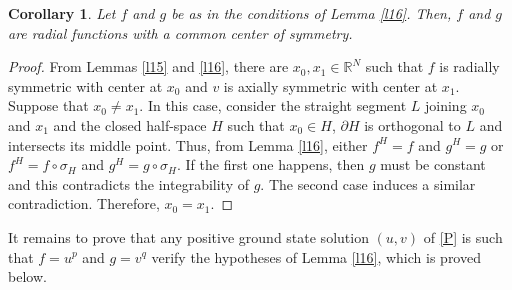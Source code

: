 \documentclass[12pt,a4paper]{article}
\newtheorem{corollary}[theorem]{Corollary}
\numberwithin{equation}{section}
\begin{document}
\begin{corollary}\label{c5}
Let $f$ and $g$ be as in the conditions of Lemma \ref{l16}. Then, $f$ and $g$ are radial functions with a common center of symmetry.
\end{corollary}
\begin{proof}
From Lemmas \ref{l15} and \ref{l16}, there are $x_0, x_1\in \mathbb{R}^N$ such that $f$ is radially symmetric with center at $x_0$ and $v$ is axially symmetric with center at $x_1$. Suppose that $x_0 \neq x_1$. In this case, consider the straight segment $L$ joining $x_0$ and $x_1$ and the closed half-space $H$ such that $x_0 \in H$, $\partial H$ is orthogonal to $L$ and intersects its middle point.  Thus, from Lemma \ref{l16}, either $f^H = f$ and $g^H = g$ or $f^H = f\circ \sigma_H $ and $g^H = g\circ \sigma_H$. If the first one happens, then $g$ must be constant and this contradicts the integrability of $g$. The second case induces a similar contradiction. Therefore, $x_0 = x_1$.
\end{proof}

It remains to prove that any positive ground state solution $(u,v)$ of \eqref{P} is such that $f= u^p$ and $g = v^q$ verify the hypotheses of Lemma \ref{l16}, which is proved below.
\end{document}
